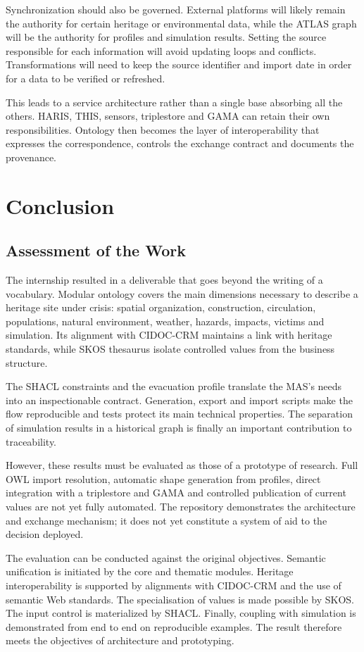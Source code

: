 \documentclass{article}
\begin{document}
Synchronization should also be governed. External platforms will likely remain the authority for certain heritage or environmental data, while the ATLAS graph will be the authority for profiles and simulation results. Setting the source responsible for each information will avoid updating loops and conflicts. Transformations will need to keep the source identifier and import date in order for a data to be verified or refreshed.

This leads to a service architecture rather than a single base absorbing all the others. HARIS, THIS, sensors, triplestore and GAMA can retain their own responsibilities. Ontology then becomes the layer of interoperability that expresses the correspondence, controls the exchange contract and documents the provenance.

\clearpage
\section{Conclusion}
\subsection{Assessment of the Work}

The internship resulted in a deliverable that goes beyond the writing of a vocabulary. Modular ontology covers the main dimensions necessary to describe a heritage site under crisis: spatial organization, construction, circulation, populations, natural environment, weather, hazards, impacts, victims and simulation. Its alignment with CIDOC-CRM maintains a link with heritage standards, while SKOS thesaurus isolate controlled values from the business structure.

The SHACL constraints and the evacuation profile translate the MAS's needs into an inspectionable contract. Generation, export and import scripts make the flow reproducible and tests protect its main technical properties. The separation of simulation results in a historical graph is finally an important contribution to traceability.

However, these results must be evaluated as those of a prototype of research. Full OWL import resolution, automatic shape generation from profiles, direct integration with a triplestore and GAMA and controlled publication of current values are not yet fully automated. The repository demonstrates the architecture and exchange mechanism; it does not yet constitute a system of aid to the decision deployed.

The evaluation can be conducted against the original objectives. Semantic unification is initiated by the core and thematic modules. Heritage interoperability is supported by alignments with CIDOC-CRM and the use of semantic Web standards. The specialisation of values is made possible by SKOS. The input control is materialized by SHACL. Finally, coupling with simulation is demonstrated from end to end on reproducible examples. The result therefore meets the objectives of architecture and prototyping.
\end{document}
